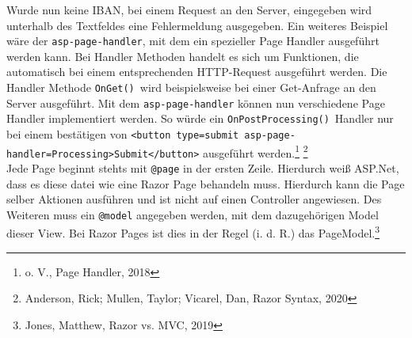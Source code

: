 \documentclass[a4paper,
12pt,
oneside]
{article}
\begin{document}
	Wurde nun keine IBAN, bei einem Request an den Server, eingegeben wird unterhalb des Textfeldes eine Fehlermeldung ausgegeben. Ein weiteres Beispiel wäre der \texttt{asp-page-handler}, mit dem ein spezieller Page Handler ausgeführt werden kann. Bei Handler Methoden handelt es sich um Funktionen, die automatisch bei einem entsprechenden HTTP-Request ausgeführt werden. Die Handler Methode \texttt{OnGet()}~wird beispielsweise bei einer Get-Anfrage an den Server ausgeführt. Mit dem \texttt{asp-page-handler} können nun verschiedene Page Handler implementiert werden. So würde ein  \texttt{OnPostProcessing()}~Handler nur bei einem bestätigen von \texttt{<button type=\glqq submit\grqq~asp-page-handler=\glqq Processing\grqq>Submit</button>} ausgeführt werden.\footnote{o. V., Page Handler, 2018} \footnote{Anderson, Rick; Mullen, Taylor; Vicarel, Dan, Razor Syntax, 2020} \\
	Jede Page beginnt stehts mit \texttt{@page} in der ersten Zeile. Hierdurch weiß ASP.Net, dass es diese datei wie eine Razor Page behandeln muss. Hierdurch kann die Page selber Aktionen ausführen und ist nicht auf einen Controller angewiesen. Des Weiteren muss ein \texttt{@model} angegeben werden, mit dem dazugehörigen Model dieser View. Bei Razor Pages ist dies in der Regel (i. d. R.) das PageModel.\footnote{Jones, Matthew, Razor vs. MVC, 2019}
	
	
	
\end{document}
